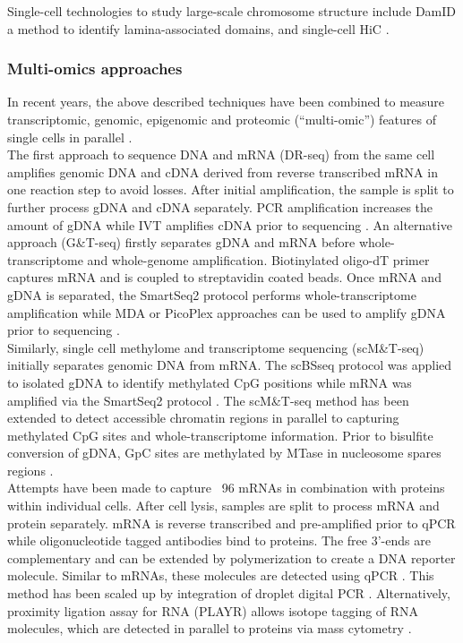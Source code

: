 Single-cell technologies to study large-scale chromosome structure include DamID \citep{Kind2015} a method to identify lamina-associated domains, and single-cell HiC \citep{Nagano2013}.

\subsubsection{Multi-omics approaches}

In recent years, the above described techniques have been combined to measure transcriptomic, genomic, epigenomic and proteomic (“multi-omic”) features of single cells in parallel \citep{Macaulay2017}. \\
The first approach to sequence DNA and mRNA (DR-seq) from the same cell amplifies genomic DNA and cDNA derived from reverse transcribed mRNA in one reaction step to avoid losses. After initial amplification, the sample is split to further process gDNA and cDNA separately. PCR amplification increases the amount of gDNA while IVT amplifies cDNA prior to sequencing \citep{Dey2015}. An alternative approach (G\&{}T-seq) firstly separates gDNA and mRNA before whole-transcriptome and whole-genome amplification. Biotinylated oligo-dT primer captures mRNA and is coupled to streptavidin coated beads. Once mRNA and gDNA is separated, the SmartSeq2 protocol performs whole-transcriptome amplification while MDA or PicoPlex approaches can be used to amplify gDNA prior to sequencing \citep{Macaulay2015}.\\
Similarly, single cell methylome and transcriptome sequencing (scM\&{}T-seq) initially separates genomic DNA from mRNA. The scBSseq protocol was applied to isolated gDNA to identify methylated CpG positions while mRNA was amplified via the SmartSeq2 protocol \citep{Angermueller2016a}.   
The scM\&{}T-seq method has been extended to detect accessible chromatin regions in parallel to capturing methylated CpG sites and whole-transcriptome information. Prior to bisulfite conversion of gDNA, GpC sites are methylated by MTase in nucleosome spares regions \citep{Pott2017, Clark2018}.\\ 
Attempts have been made to capture ~96 mRNAs in combination with proteins within individual cells. After cell lysis, samples are split to process mRNA and protein separately. mRNA is reverse transcribed and pre-amplified prior to qPCR while oligonucleotide tagged antibodies bind to proteins. The free 3’-ends are complementary and can be extended by polymerization to create a DNA reporter molecule. Similar to mRNAs, these molecules are detected using qPCR \citep{Darmanis2016}. This method has been scaled up by integration of droplet digital PCR \citep{Albayrak2016}. Alternatively, proximity ligation assay for RNA (PLAYR) allows isotope tagging of RNA molecules, which are detected in parallel to proteins via mass cytometry \citep{Frei2016}.

